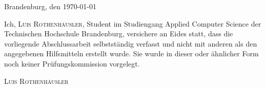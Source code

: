 \thispagestyle{empty}

\large
\begin{flushright}
  Brandenburg, den \today
\end{flushright}

\vspace*{50mm}
Ich, {\scshape Luis Rothenhäusler}, Student im Studiengang Applied Computer Science der Technischen Hochschule Brandenburg, versichere an Eides statt, dass die vorliegende Abschlussarbeit selbstständig verfasst und nicht mit anderen als den
angegebenen Hilfsmitteln erstellt wurde.
Sie wurde in dieser oder ähnlicher Form noch keiner Prüfungskommission vorgelegt.

\vspace*{50mm}

\begin{flushright}
  {\scshape Luis Rothenhäusler}
\end{flushright}

\normalsize